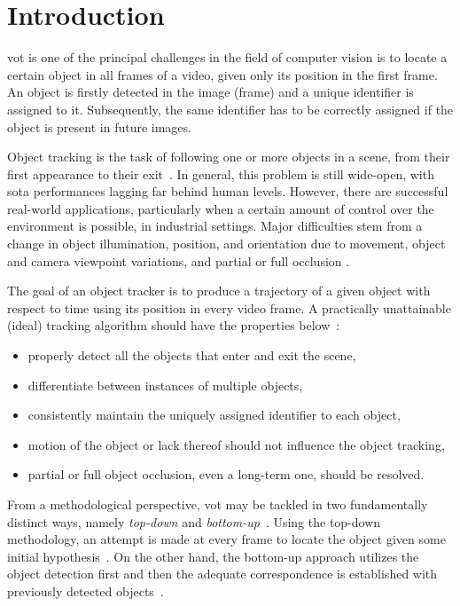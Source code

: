 \chapter{Introduction}
\label{chap:Introduction}

\Gls{vot} is one of the principal challenges in the field of computer vision is to locate a certain object in all frames of a video, given only its position in the first frame. An object is firstly detected in the image (frame) and a unique identifier is assigned to it. Subsequently, the same identifier has to be correctly assigned if the object is present in future images.

Object tracking is the task of following one or more objects in a scene, from their first appearance to their exit~\cite{forsyth2012computer}. In general, this problem is still wide-open, with \gls{sota} performances lagging far behind human levels. However, there are successful real-world applications, particularly when a certain amount of control over the environment is possible, \egtext{} in industrial settings. Major difficulties stem from a change in object illumination, position, and orientation due to movement, object and camera viewpoint variations, and partial or full occlusion \cite{jalal2012sotavot}.

The goal of an object tracker is to produce a trajectory of a given object with respect to time using its position in every video frame. A practically unattainable (ideal) tracking algorithm should have the properties below~\cite{jalal2012sotavot}:
\begin{itemize}
    \item properly detect all the objects that enter and exit the scene,
    \item differentiate between instances of multiple objects,
    \item consistently maintain the uniquely assigned identifier to each object,
    \item motion of the object or lack thereof should not influence the object tracking,
    \item partial or full object occlusion, even a long-term one, should be resolved.
\end{itemize}

From a methodological perspective, \gls{vot} may be tackled in two fundamentally distinct ways, namely \emph{top-down} and \emph{bottom-up}~\cite{jalal2012sotavot}. Using the top-down methodology, an attempt is made at every frame to locate the object given some initial hypothesis~\cite{comaniciu2003kernel}. On the other hand, the bottom-up approach utilizes the object detection first and then the adequate correspondence is established with previously detected objects~\cite{wren1997pfinder}.

